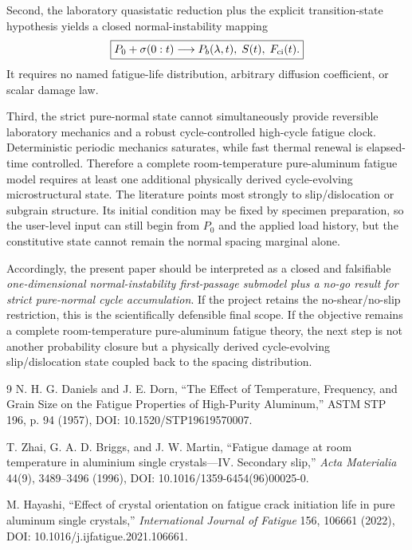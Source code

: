 \documentclass[11pt]{article}
\begin{document}
Second, the laboratory quasistatic reduction plus the explicit transition-state hypothesis yields a closed normal-instability mapping
\begin{equation}
\boxed{
P_0+\sigma(0:t)
\longrightarrow
P_b(\lambda,t),\;S(t),\;F_{\rm ci}(t).
}
\end{equation}
It requires no named fatigue-life distribution, arbitrary diffusion coefficient, or scalar damage law.

Third, the strict pure-normal state cannot simultaneously provide reversible laboratory mechanics and a robust cycle-controlled high-cycle fatigue clock. Deterministic periodic mechanics saturates, while fast thermal renewal is elapsed-time controlled. Therefore a complete room-temperature pure-aluminum fatigue model requires at least one additional physically derived cycle-evolving microstructural state. The literature points most strongly to slip/dislocation or subgrain structure. Its initial condition may be fixed by specimen preparation, so the user-level input can still begin from $P_0$ and the applied load history, but the constitutive state cannot remain the normal spacing marginal alone.

Accordingly, the present paper should be interpreted as a closed and falsifiable \emph{one-dimensional normal-instability first-passage submodel plus a no-go result for strict pure-normal cycle accumulation}. If the project retains the no-shear/no-slip restriction, this is the scientifically defensible final scope. If the objective remains a complete room-temperature pure-aluminum fatigue theory, the next step is not another probability closure but a physically derived cycle-evolving slip/dislocation state coupled back to the spacing distribution.

\begin{thebibliography}{9}
N. H. G. Daniels and J. E. Dorn,
``The Effect of Temperature, Frequency, and Grain Size on the Fatigue Properties of High-Purity Aluminum,''
ASTM STP 196, p. 94 (1957), DOI: 10.1520/STP19619570007.

T. Zhai, G. A. D. Briggs, and J. W. Martin,
``Fatigue damage at room temperature in aluminium single crystals---IV. Secondary slip,''
\emph{Acta Materialia} 44(9), 3489--3496 (1996), DOI: 10.1016/1359-6454(96)00025-0.

M. Hayashi,
``Effect of crystal orientation on fatigue crack initiation life in pure aluminum single crystals,''
\emph{International Journal of Fatigue} 156, 106661 (2022), DOI: 10.1016/j.ijfatigue.2021.106661.
\end{thebibliography}

\appendix

\end{document}
